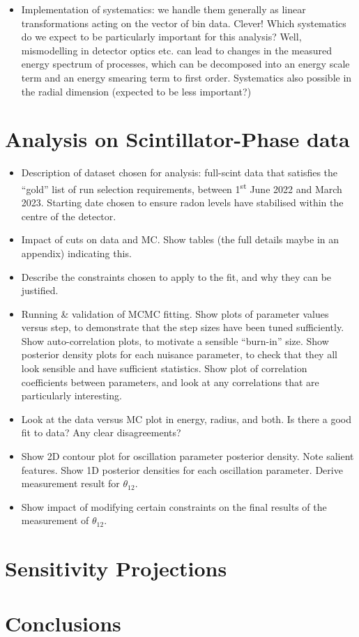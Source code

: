 \begin{itemize}
        \item Implementation of systematics: we handle them generally as linear transformations acting on the vector of bin data. Clever! Which systematics do we expect to be particularly important for this analysis? Well, mismodelling in detector optics etc. can lead to changes in the measured energy spectrum of processes, which can be decomposed into an energy scale term and an energy smearing term to first order. Systematics also possible in the radial dimension (expected to be less important?) 
        
     \end{itemize}

\section{Analysis on Scintillator-Phase data}
\begin{itemize}
    \item Description of dataset chosen for analysis: full-scint data that satisfies the ``gold'' list of run selection requirements, between 1\textsuperscript{st} June 2022 and March 2023. Starting date chosen to ensure radon levels have stabilised within the centre of the detector.
    \item Impact of cuts on data and MC. Show tables (the full details maybe in an appendix) indicating this.
    \item Describe the constraints chosen to apply to the fit, and why they can be justified.
    \item Running \& validation of MCMC fitting. Show plots of parameter values versus step, to demonstrate that the step sizes have been tuned sufficiently. Show auto-correlation plots, to motivate a sensible ``burn-in'' size. Show posterior density plots for each nuisance parameter, to check that they all look sensible and have sufficient statistics. Show plot of correlation coefficients between parameters, and look at any correlations that are particularly interesting.
    \item Look at the data versus MC plot in energy, radius, and both. Is there a good fit to data? Any clear disagreements?
    \item Show 2D contour plot for oscillation parameter posterior density. Note salient features. Show 1D posterior densities for each oscillation parameter. Derive measurement result for $\theta_{12}$.
    \item Show impact of modifying certain constraints on the final results of the measurement of $\theta_{12}$.
\end{itemize}

\section{Sensitivity Projections}


\section{Conclusions}